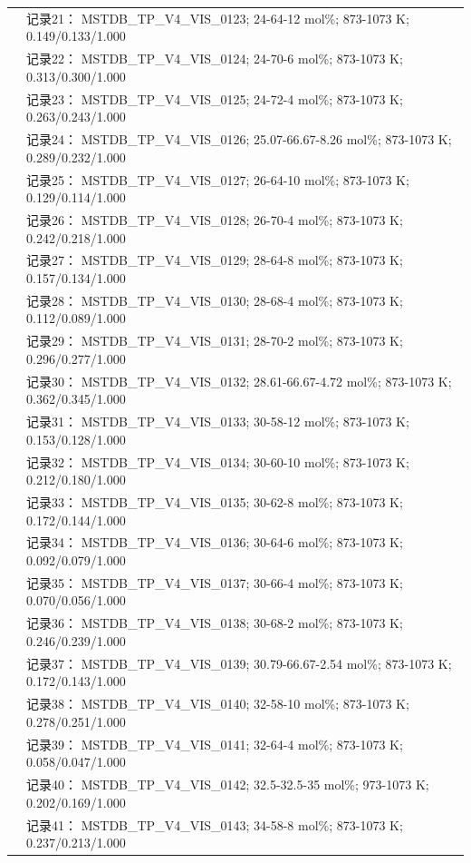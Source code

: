 \documentclass[12pt]{article}
\begin{document}
{\begin{longtable}[]{@{}
  >{\raggedright\arraybackslash}p{}
  >{\raggedright\arraybackslash}p{}@{}}
 & 记录21： MSTDB\_TP\_V4\_VIS\_0123; 24-64-12 mol\%; 873-1073 K; 0.149/0.133/1.000 \\
 & 记录22： MSTDB\_TP\_V4\_VIS\_0124; 24-70-6 mol\%; 873-1073 K; 0.313/0.300/1.000 \\
 & 记录23： MSTDB\_TP\_V4\_VIS\_0125; 24-72-4 mol\%; 873-1073 K; 0.263/0.243/1.000 \\
 & 记录24： MSTDB\_TP\_V4\_VIS\_0126; 25.07-66.67-8.26 mol\%; 873-1073 K; 0.289/0.232/1.000 \\
 & 记录25： MSTDB\_TP\_V4\_VIS\_0127; 26-64-10 mol\%; 873-1073 K; 0.129/0.114/1.000 \\
 & 记录26： MSTDB\_TP\_V4\_VIS\_0128; 26-70-4 mol\%; 873-1073 K; 0.242/0.218/1.000 \\
 & 记录27： MSTDB\_TP\_V4\_VIS\_0129; 28-64-8 mol\%; 873-1073 K; 0.157/0.134/1.000 \\
 & 记录28： MSTDB\_TP\_V4\_VIS\_0130; 28-68-4 mol\%; 873-1073 K; 0.112/0.089/1.000 \\
 & 记录29： MSTDB\_TP\_V4\_VIS\_0131; 28-70-2 mol\%; 873-1073 K; 0.296/0.277/1.000 \\
 & 记录30： MSTDB\_TP\_V4\_VIS\_0132; 28.61-66.67-4.72 mol\%; 873-1073 K; 0.362/0.345/1.000 \\
 & 记录31： MSTDB\_TP\_V4\_VIS\_0133; 30-58-12 mol\%; 873-1073 K; 0.153/0.128/1.000 \\
 & 记录32： MSTDB\_TP\_V4\_VIS\_0134; 30-60-10 mol\%; 873-1073 K; 0.212/0.180/1.000 \\
 & 记录33： MSTDB\_TP\_V4\_VIS\_0135; 30-62-8 mol\%; 873-1073 K; 0.172/0.144/1.000 \\
 & 记录34： MSTDB\_TP\_V4\_VIS\_0136; 30-64-6 mol\%; 873-1073 K; 0.092/0.079/1.000 \\
 & 记录35： MSTDB\_TP\_V4\_VIS\_0137; 30-66-4 mol\%; 873-1073 K; 0.070/0.056/1.000 \\
 & 记录36： MSTDB\_TP\_V4\_VIS\_0138; 30-68-2 mol\%; 873-1073 K; 0.246/0.239/1.000 \\
 & 记录37： MSTDB\_TP\_V4\_VIS\_0139; 30.79-66.67-2.54 mol\%; 873-1073 K; 0.172/0.143/1.000 \\
 & 记录38： MSTDB\_TP\_V4\_VIS\_0140; 32-58-10 mol\%; 873-1073 K; 0.278/0.251/1.000 \\
 & 记录39： MSTDB\_TP\_V4\_VIS\_0141; 32-64-4 mol\%; 873-1073 K; 0.058/0.047/1.000 \\
 & 记录40： MSTDB\_TP\_V4\_VIS\_0142; 32.5-32.5-35 mol\%; 973-1073 K; 0.202/0.169/1.000 \\
 & 记录41： MSTDB\_TP\_V4\_VIS\_0143; 34-58-8 mol\%; 873-1073 K; 0.237/0.213/1.000 \\

\end{longtable}}
\end{document}
